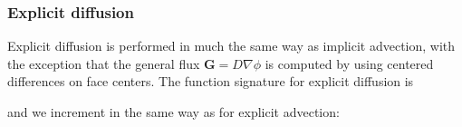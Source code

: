 \documentclass[letterpaper,10pt,english]{sphinxmanual}
\begin{document}
\begin{sphinxVerbatim}[commandchars=\\\{\},formatcom=\scriptsize]
 

    

         
    
          
                 
\end{sphinxVerbatim}


\subsubsection{Explicit diffusion}
\label{\detokenize{Solvers/CDR:explicit-diffusion}}\label{\detokenize{Solvers/CDR:chap-explicitdiffusion}}
\sphinxAtStartPar
Explicit diffusion is performed in much the same way as implicit advection, with the exception that the general flux \(\mathbf{G} = D\nabla\phi\) is computed by using centered differences on face centers.
The function signature for explicit diffusion is

\begin{sphinxVerbatim}[commandchars=\\\{\},formatcom=\scriptsize]
     
\end{sphinxVerbatim}

\sphinxAtStartPar
and we increment in the same way as for explicit advection:
\end{document}
